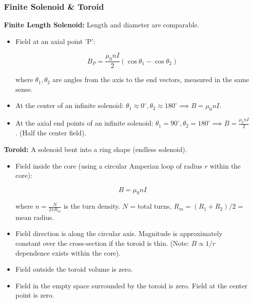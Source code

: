 \transfade[duration=0.5]

\begin{frame}[t]
    \frametitle{\textcolor{deepnavy}{\textbf{Finite Solenoid & Toroid}}}
    \renewcommand{\familydefault}{\rmdefault}
    \small

      \item<+-> \textbf{Finite Length Solenoid:} Length and diameter are comparable.
        \begin{itemize}
              \item Field at an axial point 'P':
            \begin{tcolorbox}[colback=blue!5,colframe=blue!80,boxrule=0.5pt,arc=1mm,boxsep=1pt]
            \begin{equation*}
                 B_P = \frac{\mu_0 n I}{2} (\cos\theta_1 - \cos\theta_2)
            \end{equation*}
            \end{tcolorbox}
              where $\theta_1, \theta_2$ are angles from the axis to the end vectors, measured in the same sense.
              \item At the center of an infinite solenoid: $\theta_1 \approx 0^\circ, \theta_2 \approx 180^\circ \implies B = \mu_0 n I$.
              \item At the axial end points of an infinite solenoid: $\theta_1 = 90^\circ, \theta_2 = 180^\circ \implies B = \frac{\mu_0 n I}{2}$. (Half the center field).
        \end{itemize}

    \vspace{0.5em}

      \item<+-> \textbf{Toroid:} A solenoid bent into a ring shape (endless solenoid).
        \begin{itemize}
              \item Field inside the core (using a circular Amperian loop of radius $r$ within the core):
            \begin{tcolorbox}[colback=blue!5,colframe=blue!80,boxrule=0.5pt,arc=1mm,boxsep=1pt]
            \begin{equation*}
                 B = \mu_0 n I
            \end{equation*}
            \end{tcolorbox}
              where $n = \frac{N}{2\pi R_m}$ is the turn density.   $N$ = total turns, $R_m = (R_1+R_2)/2$ = mean radius.
              \item Field direction is along the circular axis.   Magnitude is approximately constant over the cross-section if the toroid is thin.   (Note: $B \propto 1/r$ dependence exists within the core).
              \item Field outside the toroid volume is zero.
              \item Field in the empty space surrounded by the toroid is zero.   Field at the center point is zero.
        \end{itemize}
\end{frame}

